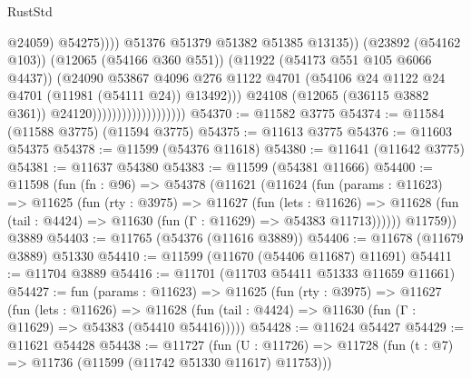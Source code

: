 \begin{lexlean}{RustStd}
\begin{coremodule}
                                                          @24059)
                                                        @54275))))
                                                @51376
                                                @51379
                                                @51382
                                                @51385
                                                @13135))
                                            (@23892 (@54162 @103))
                                            (@12065 (@54166 @360 @551))
                                            (@11922 (@54173 @551 @105 @6066 @4437))
                                            (@24090
                                              @53867
                                              @4096
                                              @276
                                              @1122
                                              @4701
                                              (@54106
                                                @24
                                                @1122
                                                @24
                                                @4701
                                                (@11981 (@54111 @24))
                                                @13492)))
                                          @24108
                                          (@12065 (@36115 @3882 @361))
                                          @24120)))))))))))))))))))
@54370 := @11582 @3775
@54374 := @11584 (@11588 @3775) (@11594 @3775)
@54375 := @11613 @3775
@54376 := @11603 @54375
@54378 := @11599 (@54376 @11618)
@54380 := @11641 (@11642 @3775)
@54381 := @11637 @54380
@54383 := @11599 (@54381 @11666)
@54400 := @11598
    (fun (fn : @96) =>
    @54378
      (@11621
        (@11624
          (fun (params : @11623) =>
          @11625
            (fun (rty : @3975) =>
            @11627
              (fun (lets : @11626) =>
              @11628 (fun (tail : @4424) => @11630 (fun (Γ : @11629) => @54383 @11713))))))
        @11759))
    @3889
@54403 := @11765 (@54376 (@11616 @3889))
@54406 := @11678 (@11679 @3889) @51330
@54410 := @11599 (@11670 (@54406 @11687) @11691)
@54411 := @11704 @3889
@54416 := @11701 (@11703 @54411 @51333 @11659 @11661)
@54427 := fun (params : @11623) =>
  @11625
    (fun (rty : @3975) =>
    @11627
      (fun (lets : @11626) =>
      @11628 (fun (tail : @4424) => @11630 (fun (Γ : @11629) => @54383 (@54410 @54416)))))
@54428 := @11624 @54427
@54429 := @11621 @54428
@54438 := @11727
    (fun (U : @11726) => @11728 (fun (t : @7) => @11736 (@11599 (@11742 @51330 @11617) @11753)))

\end{coremodule}
\end{lexlean}
